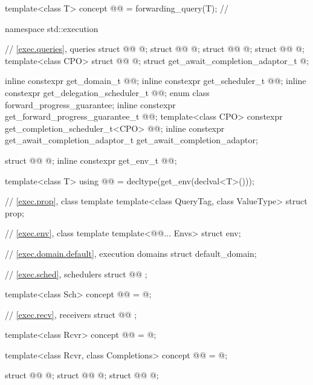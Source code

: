 \begin{codeblock}
{  template<class T>
    concept @@ = forwarding_query(T{});           // \expos
}

namespace std::execution {
  // \ref{exec.queries}, queries
  struct @@ { @\unspec@ };
  struct @@ { @\unspec@ };
  struct @@ { @\unspec@ };
  struct @@ { @\unspec@ };
  template<class CPO>
    struct @@ { @\unspec@ };
  struct get_await_completion_adaptor_t { @\unspec@ };

  inline constexpr get_domain_t @@{};
  inline constexpr get_scheduler_t @@{};
  inline constexpr get_delegation_scheduler_t @@{};
  enum class forward_progress_guarantee;
  inline constexpr get_forward_progress_guarantee_t @@{};
  template<class CPO>
    constexpr get_completion_scheduler_t<CPO> @@{};
  inline constexpr get_await_completion_adaptor_t get_await_completion_adaptor{};

  struct @@ { @\unspec@ };
  inline constexpr get_env_t @@{};

  template<class T>
    using @@ = decltype(get_env(declval<T>()));

  // \ref{exec.prop}, class template 
  template<class QueryTag, class ValueType>
    struct prop;

  // \ref{exec.env}, class template 
  template<@@... Envs>
    struct env;

  // \ref{exec.domain.default}, execution domains
  struct default_domain;

  // \ref{exec.sched}, schedulers
  struct @@ {};

  template<class Sch>
    concept @@ = @\seebelow@;

  // \ref{exec.recv}, receivers
  struct @@ {};

  template<class Rcvr>
    concept @@ = @\seebelow@;

  template<class Rcvr, class Completions>
    concept @@ = @\seebelow@;

  struct @@ { @\unspec@ };
  struct @@ { @\unspec@ };
  struct @@ { @\unspec@ };

}
\end{codeblock}

